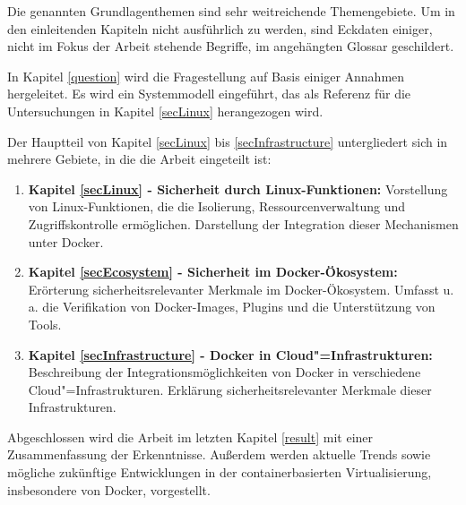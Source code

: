 \documentclass[../main.tex]{subfiles}
\begin{document}
    Die genannten Grundlagenthemen sind sehr weitreichende Themengebiete. Um in den einleitenden Kapiteln nicht ausführlich zu werden, sind Eckdaten einiger, nicht im Fokus der Arbeit stehende Begriffe, im angehängten Glossar geschildert.

    In Kapitel \ref{question} wird die Fragestellung auf Basis einiger Annahmen hergeleitet. Es wird ein Systemmodell eingeführt, das als Referenz für die Untersuchungen in Kapitel \ref{secLinux} herangezogen wird.

    Der Hauptteil von Kapitel \ref{secLinux} bis \ref{secInfrastructure} untergliedert sich in mehrere Gebiete, in die die Arbeit eingeteilt ist:
    \begin{enumerate}
      \item \textbf{Kapitel \ref{secLinux} - Sicherheit durch Linux-Funktionen:} Vorstellung von Linux-Funktionen, die die Isolierung, Ressourcenverwaltung und Zugriffskontrolle ermöglichen. Darstellung der Integration dieser Mechanismen unter Docker.
      \item \textbf{Kapitel \ref{secEcosystem} - Sicherheit im Docker-Ökosystem:} Erörterung sicherheitsrelevanter Merkmale im Docker-Ökosystem. Umfasst u.\,a. die Verifikation von Docker-Images, Plugins und die Unterstützung von Tools.
      \item \textbf{Kapitel \ref{secInfrastructure} - Docker in Cloud"=Infrastrukturen:} Beschreibung der Integrationsmöglichkeiten von Docker in verschiedene Cloud"=Infrastrukturen. Erklärung sicherheitsrelevanter Merkmale dieser Infrastrukturen.
    \end{enumerate}

    Abgeschlossen wird die Arbeit im letzten Kapitel \ref{result} mit einer Zusammenfassung der Erkenntnisse. Außerdem werden aktuelle Trends sowie mögliche zukünftige Entwicklungen in der containerbasierten Virtualisierung, insbesondere von Docker, vorgestellt.
\end{document}
